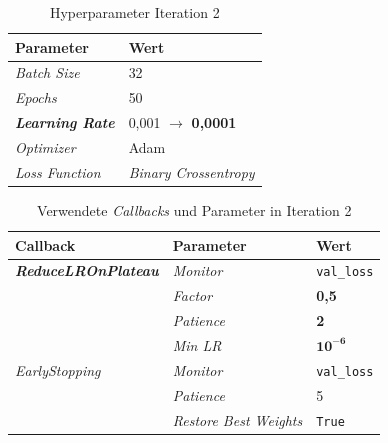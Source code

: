 \documentclass[
    a4paper,        %
    11pt,           %
    ngerman,        %
    parskip=half,   %
    listof=totoc,   %
    bibliography=totoc %
]{scrartcl}
\begin{document}
\begin{table}[H]
    \centering
    \caption{Hyperparameter Iteration 2}
    \label{tab:hyperparams_iter2}
    \begin{tabular}{ll}
        \toprule
        \textbf{Parameter} & \textbf{Wert} \\
        \midrule
        \textit{Batch Size} & 32 \\
        \textit{Epochs} & 50 \\
        \textbf{\textit{Learning Rate}} & 0,001 $\rightarrow$ \textbf{0,0001} \\
        \textit{Optimizer} & Adam \\
        \textit{Loss Function} & \textit{Binary Crossentropy} \\
        \bottomrule
    \end{tabular}
\end{table}

\begin{table}[H]
    \centering
    \caption{Verwendete \textit{Callbacks} und Parameter in Iteration 2}
    \label{tab:callbacks_iter2}
    \begin{tabular}{lll}
        \toprule
        \textbf{Callback} & \textbf{Parameter} & \textbf{Wert} \\
        \midrule
        \textbf{\textit{ReduceLROnPlateau}} & \textit{Monitor} & \texttt{val\_loss} \\
                                   & \textit{Factor} & \textbf{0,5} \\
                                  & \textit{Patience} & \textbf{2} \\
                                  & \textit{Min LR} & $\mathbf{10^{-6}}$ \\
        \midrule
        \textit{EarlyStopping}     & \textit{Monitor} & \texttt{val\_loss} \\
                                  & \textit{Patience} & 5 \\
                                  & \textit{Restore Best Weights} & \texttt{True} \\
        \bottomrule
    \end{tabular}
\end{table}
\end{document}
